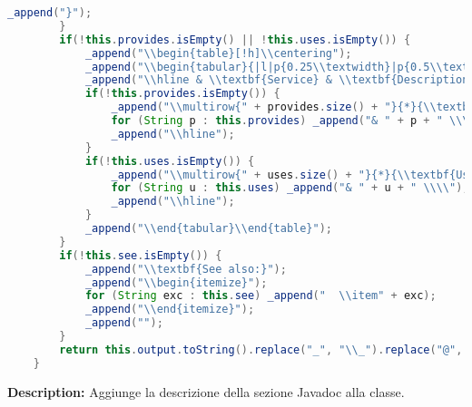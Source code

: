 \documentclass{article}
\makeatletter
\newcommand\atsign{@}
\makeatother
\begin{document}
\begin{lstlisting}[language=Java]
            _append("}");
        }
        if(!this.provides.isEmpty() || !this.uses.isEmpty()) {
            _append("\\begin{table}[!h]\\centering");
            _append("\\begin{tabular}{|l|p{0.25\\textwidth}|p{0.5\\textwidth}|}");
            _append("\\hline & \\textbf{Service} & \\textbf{Description} \\\\ \\hline");
            if(!this.provides.isEmpty()) {
                _append("\\multirow{" + provides.size() + "}{*}{\\textbf{Provides}}");
                for (String p : this.provides) _append("& " + p + " \\\\");
                _append("\\hline");
            }
            if(!this.uses.isEmpty()) {
                _append("\\multirow{" + uses.size() + "}{*}{\\textbf{Uses}}");
                for (String u : this.uses) _append("& " + u + " \\\\");
                _append("\\hline");
            }
            _append("\\end{tabular}\\end{table}");
        }
        if(!this.see.isEmpty()) {
            _append("\\textbf{See also:}");
            _append("\\begin{itemize}");
            for (String exc : this.see) _append("  \\item" + exc);
            _append("\\end{itemize}");
            _append("");
        }
        return this.output.toString().replace("_", "\\_").replace("@", "\\atsign ");
    }
\end{lstlisting}
\vspace{0.5cm}
\textbf{Description:}  Aggiunge la descrizione della sezione Javadoc alla classe. 
\end{document}
